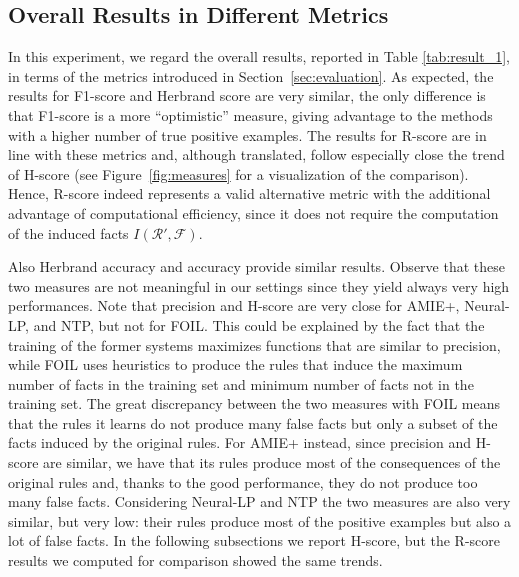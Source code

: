 \documentclass[letterpaper]{article} \usepackage{aaai20}  \usepackage{times}  \usepackage{helvet} \usepackage{courier}  \usepackage[hyphens]{url}  \usepackage{graphicx} \urlstyle{rm} \def\UrlFont{\rm}  \usepackage{graphicx}  \frenchspacing  \setlength{\pdfpagewidth}{8.5in}  \setlength{\pdfpageheight}{11in}  \usepackage{amsthm}
\theoremstyle{definition}
\begin{document}
\subsection{Overall Results in Different Metrics}\label{sec:exp1}


In this experiment, we regard the overall results, reported in Table \ref{tab:result_1}, in terms of the metrics introduced in Section~\ref{sec:evaluation}.
As expected, the results for F1-score and Herbrand score are very similar, the only difference is that F1-score is a more ``optimistic'' measure, giving advantage to the methods with a higher number of true positive examples.
The results for R-score are in line with these metrics and, although translated, follow especially close the trend of H-score  
(see Figure~\ref{fig:measures} for a visualization of the comparison). Hence, R-score indeed represents
a valid alternative metric with the additional advantage of computational efficiency, since
it does not require the computation of the induced facts $I(\mathcal{R}',\mathcal{F})$.

Also Herbrand accuracy and accuracy provide similar results. Observe that these two measures are not meaningful in our settings since they yield always very high performances.
Note that precision and H-score are very close for AMIE+, Neural-LP, and NTP, but not for FOIL.
This could be explained by the fact that the training of the former systems maximizes functions that are similar to precision, while FOIL uses heuristics to produce the rules that induce the maximum number of facts in the training set and minimum number of facts not in the training set.
 The great discrepancy between the two measures with FOIL means that the rules it learns do not produce many false facts but only a subset of the facts induced by the original rules.
For AMIE+ instead, since precision and H-score are similar, we have that its rules  produce most of the consequences of the original rules and, thanks to the good performance, they do not produce too many false facts.
Considering Neural-LP and NTP the two measures are also very similar, but very low: their rules produce most of the positive examples but also a lot of false facts.
In the following subsections we report H-score, but the R-score results we computed for comparison showed the same trends.
\end{document}
